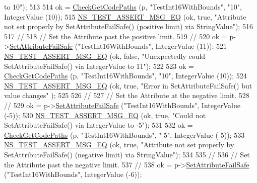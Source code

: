\begin{DoxyCode}
{       to 10"});
513 
514   ok = \hyperlink{classAttributeTestCase_a902fb84c803f1c898329f9263575331e}{CheckGetCodePaths} (p, \textcolor{stringliteral}{"TestInt16WithBounds"}, \textcolor{stringliteral}{"10"}, IntegerValue (10));
515   \hyperlink{group__testing_ga2a9d78cffb3db8e867c35fff0b698cf5}{NS\_TEST\_ASSERT\_MSG\_EQ} (ok, \textcolor{keyword}{true}, \textcolor{stringliteral}{"Attribute not set properly by
       SetAttributeFailSafe() (positive limit) via StringValue"});
516 
517   \textcolor{comment}{//}
518   \textcolor{comment}{// Set the Attribute past the positive limit.}
519   \textcolor{comment}{//}
520   ok = p->\hyperlink{classns3_1_1ObjectBase_aa7d333004e970f925a4ed5df275541b5}{SetAttributeFailSafe} (\textcolor{stringliteral}{"TestInt16WithBounds"}, IntegerValue (11));
521   \hyperlink{group__testing_ga2a9d78cffb3db8e867c35fff0b698cf5}{NS\_TEST\_ASSERT\_MSG\_EQ} (ok, \textcolor{keyword}{false}, \textcolor{stringliteral}{"Unexpectedly could SetAttributeFailSafe() via
       IntegerValue to 11"});
522 
523   ok = \hyperlink{classAttributeTestCase_a902fb84c803f1c898329f9263575331e}{CheckGetCodePaths} (p, \textcolor{stringliteral}{"TestInt16WithBounds"}, \textcolor{stringliteral}{"10"}, IntegerValue (10));
524   \hyperlink{group__testing_ga2a9d78cffb3db8e867c35fff0b698cf5}{NS\_TEST\_ASSERT\_MSG\_EQ} (ok, \textcolor{keyword}{true}, \textcolor{stringliteral}{"Error in SetAttributeFailSafe() but value changes"}
      );
525 
526   \textcolor{comment}{//}
527   \textcolor{comment}{// Set the Attribute at the negative limit.}
528   \textcolor{comment}{//}
529   ok = p->\hyperlink{classns3_1_1ObjectBase_aa7d333004e970f925a4ed5df275541b5}{SetAttributeFailSafe} (\textcolor{stringliteral}{"TestInt16WithBounds"}, IntegerValue (-5));
530   \hyperlink{group__testing_ga2a9d78cffb3db8e867c35fff0b698cf5}{NS\_TEST\_ASSERT\_MSG\_EQ} (ok, \textcolor{keyword}{true}, \textcolor{stringliteral}{"Could not SetAttributeFailSafe() via IntegerValue
       to -5"});
531 
532   ok = \hyperlink{classAttributeTestCase_a902fb84c803f1c898329f9263575331e}{CheckGetCodePaths} (p, \textcolor{stringliteral}{"TestInt16WithBounds"}, \textcolor{stringliteral}{"-5"}, IntegerValue (-5));
533   \hyperlink{group__testing_ga2a9d78cffb3db8e867c35fff0b698cf5}{NS\_TEST\_ASSERT\_MSG\_EQ} (ok, \textcolor{keyword}{true}, \textcolor{stringliteral}{"Attribute not set properly by
       SetAttributeFailSafe() (negative limit) via StringValue"});
534 
535   \textcolor{comment}{//}
536   \textcolor{comment}{// Set the Attribute past the negative limit.}
537   \textcolor{comment}{//}
538   ok = p->\hyperlink{classns3_1_1ObjectBase_aa7d333004e970f925a4ed5df275541b5}{SetAttributeFailSafe} (\textcolor{stringliteral}{"TestInt16WithBounds"}, IntegerValue (-6));

\end{DoxyCode}
